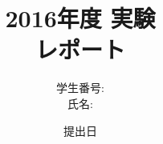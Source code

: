 \documentclass[a4j]{jarticle}
\title{
  \vspace{-25mm}
  2016年度 実験\\レポート
}
\author{学生番号:\\氏名:}
\date{提出日}
\begin{document}
\setcounter{page}{1}

\maketitle

\begin{abstract}
  
\end{abstract}

\tableofcontents %
\listoffigures %
\listoftables %

%

%

%

%

%

%

%

%

\appendix

%
\end{document}
